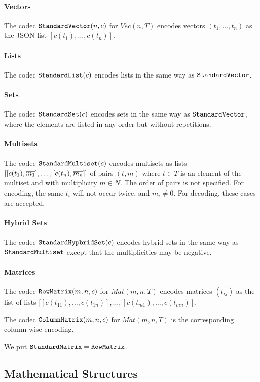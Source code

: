 \paragraph{Vectors}
The codec $\cn{StandardVector}(n,c)$ for $Vec(n,T)$ encodes vectors $(t_1,\ldots,t_n)$ as the JSON list $[c(t_1),\ldots,c(t_n)]$.

\paragraph{Lists}
The codec $\cn{StandardList}(c)$ encodes lists in the same way as $\cn{StandardVector}$.

\paragraph{Sets}
The codec $\cn{StandardSet}(c)$ encodes sets in the same way as $\cn{StandardVector}$, where the elements are listed in any order but without repetitions.

\paragraph{Multisets}
The codec $\cn{StandardMultiset}(c)$ encodes multisets as lists $[[c(t_1),\ov{m_1}], \ldots, [c(t_n),\ov{m_n}]]$ of pairs $(t,m)$ where $t\in T$ is an element of the multiset and with multiplicity $m\in N$.
The order of pairs is not specified.
For encoding, the same $t_i$ will not occur twice, and $m_i\neq 0$. For decoding, these cases are accepted.

\paragraph{Hybrid Sets}
The codec $\cn{StandardHypbridSet}(c)$ encodes hybrid sets in the same way as $\cn{StandardMultiset}$ except that the multiplicities may be negative.

\paragraph{Matrices}
The codec $\cn{RowMatrix}(m,n,c)$ for $Mat(m,n,T)$ encodes matrices $(t_{ij})$ as the list of lists $[[c(t_{11}),\ldots,c(t_{1n})], \ldots, [c(t_{m1}),\ldots,c(t_{mn})]$.

The codec $\cn{ColumnMatrix}(m,n,c)$ for $Mat(m,n,T)$ is the corresponding column-wise encoding.

We put $\cn{StandardMatrix}=\cn{RowMatrix}$.

\subsection{Mathematical Structures}

